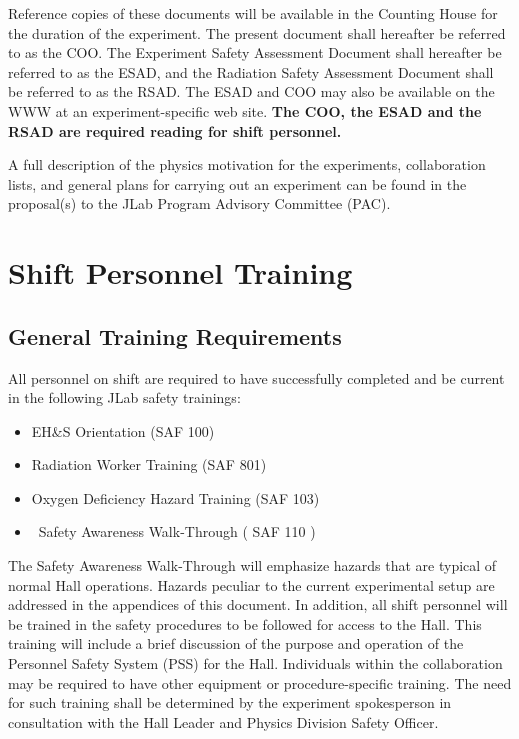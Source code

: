 \documentclass[10pt]{article}
\begin{document}

Reference copies of these documents will be available in the Counting 
House for the duration of the experiment. The present document shall 
hereafter be referred to as the COO. The Experiment Safety Assessment 
Document shall hereafter be referred to as the ESAD, and the
Radiation Safety Assessment Document shall be referred to as the RSAD.
The ESAD and COO may also be available on the WWW at an experiment-specific 
web site. {\bf The COO, the ESAD and the RSAD are required reading for 
shift personnel.}

A full description of the physics motivation for the experiments, collaboration 
lists, and general plans for carrying out an experiment can be found in the
proposal(s) to the JLab Program Advisory Committee (PAC). 

\section{Shift Personnel Training}

\subsection{General Training Requirements}
All personnel on shift are required to have successfully completed and be 
current in the following JLab safety trainings:

\begin{itemize}

\item EH\&S Orientation (SAF 100) 

\item Radiation Worker Training (SAF 801) 

\item Oxygen Deficiency Hazard Training (SAF 103) 

\item \HALL\ Safety Awareness Walk-Through ( SAF 110 )

\end{itemize}

The Safety Awareness Walk-Through will
emphasize hazards that are typical of normal Hall operations.
Hazards  peculiar to the current experimental setup are addressed in the appendices 
of this document. 
In addition, all shift personnel will be trained in the safety procedures to be
followed for access to the Hall. This
training will include a brief discussion of the purpose and operation of the
Personnel Safety System (PSS) for the Hall. 
Individuals within the collaboration may be required to have other equipment 
or procedure-specific training. The need for such
training shall be determined by the experiment spokesperson in consultation 
with the Hall Leader and Physics Division Safety Officer.
\end{document}
